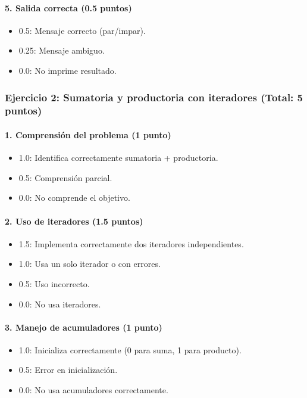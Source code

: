 \begin{solution}
\paragraph{5. Salida correcta (0.5 puntos)}
\begin{itemize}
    \item 0.5: Mensaje correcto (par/impar).
    \item 0.25: Mensaje ambiguo.
    \item 0.0: No imprime resultado.
\end{itemize}

\vspace{0.5cm}

\subsubsection*{Ejercicio 2: Sumatoria y productoria con iteradores (Total: 5 puntos)}

\paragraph{1. Comprensión del problema (1 punto)}
\begin{itemize}
    \item 1.0: Identifica correctamente sumatoria + productoria.
    \item 0.5: Comprensión parcial.
    \item 0.0: No comprende el objetivo.
\end{itemize}

\paragraph{2. Uso de iteradores (1.5 puntos)}
\begin{itemize}
    \item 1.5: Implementa correctamente dos iteradores independientes.
    \item 1.0: Usa un solo iterador o con errores.
    \item 0.5: Uso incorrecto.
    \item 0.0: No usa iteradores.
\end{itemize}

\paragraph{3. Manejo de acumuladores (1 punto)}
\begin{itemize}
    \item 1.0: Inicializa correctamente (0 para suma, 1 para producto).
    \item 0.5: Error en inicialización.
    \item 0.0: No usa acumuladores correctamente.
\end{itemize}


\end{solution}
